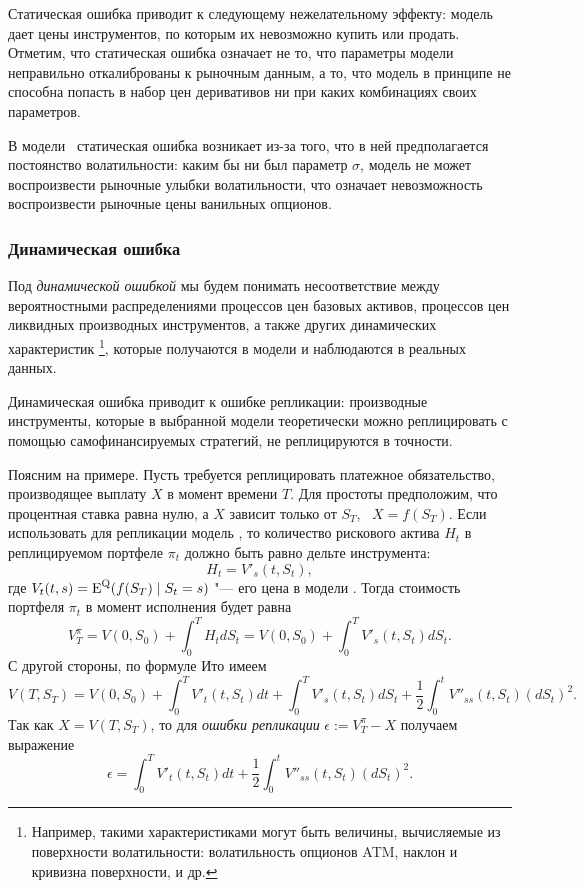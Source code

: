 Статическая ошибка приводит к следующему нежелательному эффекту: модель дает цены инструментов, по которым их невозможно купить или продать.
Отметим, что статическая ошибка означает не то, что параметры модели неправильно откалиброваны к рыночным данным, а то, что модель в принципе не способна попасть в набор цен деривативов ни при каких комбинациях своих параметров.

В модели \bs\ статическая ошибка возникает из-за того, что в ней предполагается постоянство волатильности:
каким бы ни был параметр $\sigma$, модель не может воспроизвести рыночные улыбки волатильности, что означает невозможность воспроизвести рыночные цены ванильных опционов.


\subsubsection{Динамическая ошибка}

Под \emph{динамической ошибкой} мы будем понимать несоответствие между вероятностными распределениями процессов цен базовых активов, процессов цен ликвидных производных инструментов, а также других динамических характеристик%
\footnote{Например, такими характеристиками могут быть величины, вычисляемые из поверхности волатильности: волатильность опционов ATM, наклон и кривизна поверхности, и др.}, которые получаются в модели и наблюдаются в реальных данных. 

Динамическая ошибка приводит к ошибке репликации: производные инструменты, которые в выбранной модели теоретически можно реплицировать с помощью самофинансируемых стратегий, не реплицируются в точности.

Поясним на примере.
Пусть требуется реплицировать платежное обязательство, производящее выплату $X$ в момент времени $T$.
Для простоты предположим, что процентная ставка равна нулю, а $X$ зависит только от $S_T$, \te\ $X=f(S_T)$.
Если использовать для репликации модель \bs, то количество рискового актива $H_t$ в реплицируемом портфеле $\pi_t$ должно быть равно дельте инструмента:
\[
H_t = V'_s(t,S_t),
\]
где $V_t(t,s) = \operatorname{E}^{\mathrm{Q}} (f(S_T) \mid S_t=s)$ "--- его цена в модели \bs.
Тогда стоимость портфеля $\pi_t$ в момент исполнения будет равна
\[
V_T^\pi = V(0,S_0) + \int_0^T H_t d S_t = V(0,S_0) + \int_0^T V'_s(t,S_t) d S_t.
\]
С другой стороны, по формуле Ито имеем
\[
V(T,S_T) = V(0,S_0) + \int_0^T V'_t(t,S_t) dt + \int_0^T V'_s(t,S_t) d S_t + \frac12 \int_0^t V''_{ss}(t,S_t) (dS_t)^2.
\]
Так как $X=V(T,S_T)$, то для \emph{ошибки репликации} $\epsilon := V_T^\pi - X$ получаем выражение
\[
\epsilon = \int_0^T V'_t(t,S_t) dt + \frac12 \int_0^t V''_{ss}(t,S_t) (dS_t)^2.
\]


